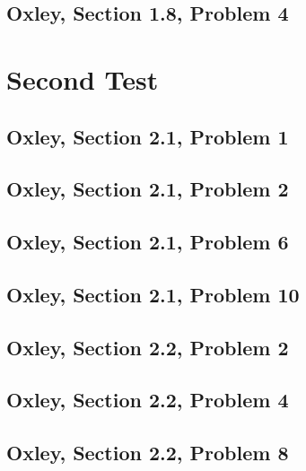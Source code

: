     \section{Oxley, Section 1.8, Problem 4}
        
        \clearpage

\chapter{Second Test}
    \section{Oxley, Section 2.1, Problem 1}
        
        \clearpage

    \section{Oxley, Section 2.1, Problem 2}
        
        \clearpage

    \section{Oxley, Section 2.1, Problem 6}
        
        \clearpage

    \section{Oxley, Section 2.1, Problem 10}
        
        \clearpage

    \section{Oxley, Section 2.2, Problem 2}
        
        \clearpage

    \section{Oxley, Section 2.2, Problem 4}
        
        \clearpage

    \section{Oxley, Section 2.2, Problem 8}
        
        \clearpage

